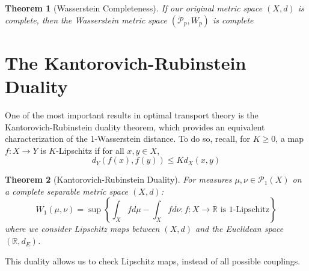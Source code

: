 \documentclass[11pt,a4paper]{article}
\newtheorem{theorem}{Theorem}[section]
\theoremstyle{remark}
\begin{document}
\begin{theorem}[Wasserstein Completeness]
If our original metric space $(X,d)$ is complete, then the Wasserstein metric space $(\mathcal{P}_p, W_p)$ is complete
\end{theorem}


\section{The Kantorovich-Rubinstein Duality}

One of the most important results in optimal transport theory is the Kantorovich-Rubinstein duality theorem, which provides an equivalent characterization of the 1-Wasserstein distance. To do so, recall, for $K \ge 0$, a map $f:X \to Y$ is $K$-Lipschitz if for all $x,y \in X$, \[
d_Y(f(x), f(y)) \le K d_X(x,y)
\]

\begin{theorem}[Kantorovich-Rubinstein Duality]
For measures \( \mu, \nu \in \mathcal{P}_1(X) \) on a complete separable metric space \( (X,d) \):
\[
W_1(\mu,\nu) = \sup\left\{\int_X f d\mu - \int_X f d\nu : f: X \to \mathbb{R} \text{ is 1-Lipschitz}\right\}
\]
where we consider Lipschitz maps between $(X,d)$ and the Euclidean space $(\mathbb{R}, d_E)$.
\end{theorem}
\noindent
This duality allows us to check Lipschitz maps, instead of all possible couplings.
\end{document}
